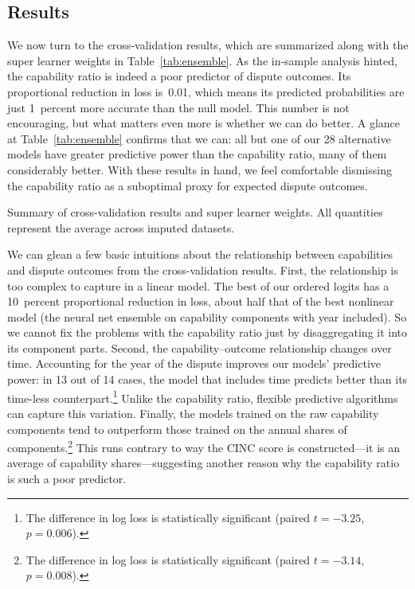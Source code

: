 \subsection{Results}

We now turn to the cross-validation results, which are summarized along with the super learner weights in Table~\ref{tab:ensemble}.
As the in-sample analysis hinted, the capability ratio is indeed a poor predictor of dispute outcomes.
Its proportional reduction in loss is~0.01, which means its predicted probabilities are just 1~percent more accurate than the null model.
This number is not encouraging, but what matters even more is whether we can do better.
A glance at Table~\ref{tab:ensemble} confirms that we can: all but one of our 28 alternative models have greater predictive power than the capability ratio, many of them considerably better.
With these results in hand, we feel comfortable dismissing the capability ratio as a suboptimal proxy for expected dispute outcomes.

\begin{table}[tp]
  \centering
  
  \caption{
    Summary of cross-validation results and super learner weights.
    All quantities represent the average across imputed datasets.
  }
  \label{tab:ensemble}
\end{table}

We can glean a few basic intuitions about the relationship between capabilities and dispute outcomes from the cross-validation results.
First, the relationship is too complex to capture in a linear model.
The best of our ordered logits has a 10~percent proportional reduction in loss, about half that of the best nonlinear model (the neural net ensemble on capability components with year included).
So we cannot fix the problems with the capability ratio just by disaggregating it into its component parts.
Second, the capability--outcome relationship changes over time.
Accounting for the year of the dispute improves our models' predictive power: in 13 out of 14 cases, the model that includes time predicts better than its time-less counterpart.\footnote{
  The difference in log loss is statistically significant (paired $t = -3.25$, $p = 0.006$).
}
Unlike the capability ratio, flexible predictive algorithms can capture this variation.
Finally, the models trained on the raw capability components tend to outperform those trained on the annual shares of components.\footnote{
  The difference in log loss is statistically significant (paired $t = -3.14$, $p = 0.008$).
}
This runs contrary to way the CINC score is constructed---it is an average of capability shares---suggesting another reason why the capability ratio is such a poor predictor.

